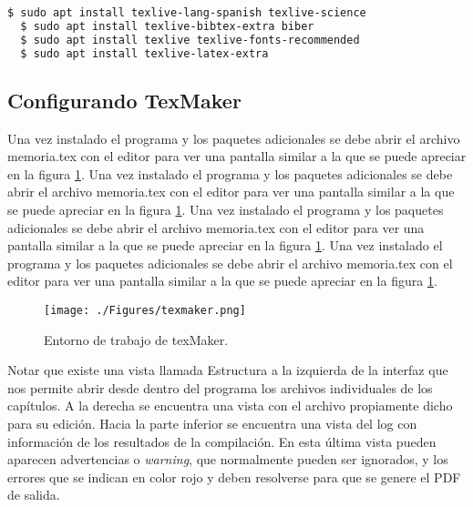 \begin{lstlisting}[language=bash]
  $ sudo apt install texlive-lang-spanish texlive-science 
  $ sudo apt install texlive-bibtex-extra biber
  $ sudo apt install texlive texlive-fonts-recommended
  $ sudo apt install texlive-latex-extra
\end{lstlisting}


\subsection{Configurando TexMaker}
\label{subsec:configurando}



Una vez instalado el programa y los paquetes adicionales se debe abrir el archivo memoria.tex con el editor para ver una pantalla similar a la que se puede apreciar en la figura \ref{fig:texmaker}. 
Una vez instalado el programa y los paquetes adicionales se debe abrir el archivo memoria.tex con el editor para ver una pantalla similar a la que se puede apreciar en la figura \ref{fig:texmaker}. 
Una vez instalado el programa y los paquetes adicionales se debe abrir el archivo memoria.tex con el editor para ver una pantalla similar a la que se puede apreciar en la figura \ref{fig:texmaker}. 
Una vez instalado el programa y los paquetes adicionales se debe abrir el archivo memoria.tex con el editor para ver una pantalla similar a la que se puede apreciar en la figura \ref{fig:texmaker}. 

\vspace{1cm}

\begin{figure}[htbp]
	\centering
	\texttt{[image: ./Figures/texmaker.png]}
	\caption{Entorno de trabajo de texMaker.}
	\label{fig:texmaker}
\end{figure}

\vspace{1cm}

Notar que existe una vista llamada Estructura a la izquierda de la interfaz que nos permite abrir desde dentro del programa los archivos individuales de los capítulos.  A la derecha se encuentra una vista con el archivo propiamente dicho para su edición. Hacia la parte inferior se encuentra una vista del log con información de los resultados de la compilación.  En esta última vista pueden aparecen advertencias o \textit{warning}, que normalmente pueden ser ignorados, y los errores que se indican en color rojo y deben resolverse para que se genere el PDF de salida.

